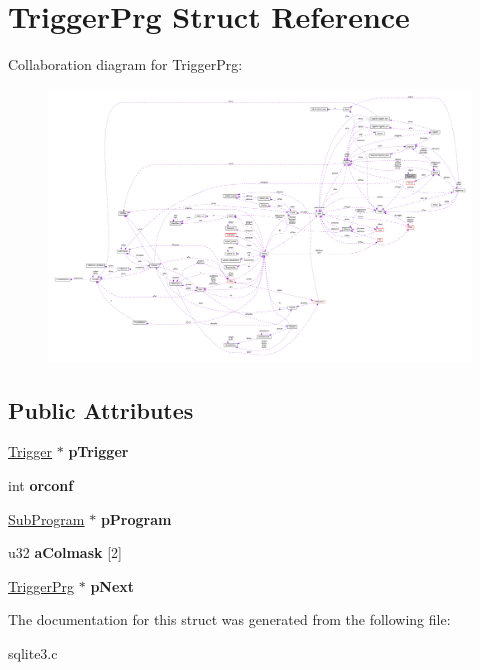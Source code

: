 \hypertarget{struct_trigger_prg}{\section{Trigger\-Prg Struct Reference}
\label{struct_trigger_prg}
}


Collaboration diagram for Trigger\-Prg\-:\nopagebreak
\begin{figure}[H]
\begin{center}
\leavevmode
\includegraphics[width=350pt]{struct_trigger_prg__coll__graph}
\end{center}
\end{figure}
\subsection*{Public Attributes}
\begin{DoxyCompactItemize}
\item 
\hypertarget{struct_trigger_prg_af70e5a74c954bc7a1eb8ee1162c40368}{\hyperlink{struct_trigger}{Trigger} $\ast$ {\bfseries p\-Trigger}}\label{struct_trigger_prg_af70e5a74c954bc7a1eb8ee1162c40368}

\item 
\hypertarget{struct_trigger_prg_aa475acda58c472b3491f6aa17020bf68}{int {\bfseries orconf}}\label{struct_trigger_prg_aa475acda58c472b3491f6aa17020bf68}

\item 
\hypertarget{struct_trigger_prg_aa770aee270c7c5df85578dc4a6686134}{\hyperlink{struct_sub_program}{Sub\-Program} $\ast$ {\bfseries p\-Program}}\label{struct_trigger_prg_aa770aee270c7c5df85578dc4a6686134}

\item 
\hypertarget{struct_trigger_prg_aeac0a4cd1f1d287981ae33c4d171b614}{u32 {\bfseries a\-Colmask} \mbox{[}2\mbox{]}}\label{struct_trigger_prg_aeac0a4cd1f1d287981ae33c4d171b614}

\item 
\hypertarget{struct_trigger_prg_a551b8a29a8c4ff785afab1596e5d8710}{\hyperlink{struct_trigger_prg}{Trigger\-Prg} $\ast$ {\bfseries p\-Next}}\label{struct_trigger_prg_a551b8a29a8c4ff785afab1596e5d8710}

\end{DoxyCompactItemize}


The documentation for this struct was generated from the following file\-:\begin{DoxyCompactItemize}
\item 
sqlite3.\-c\end{DoxyCompactItemize}
